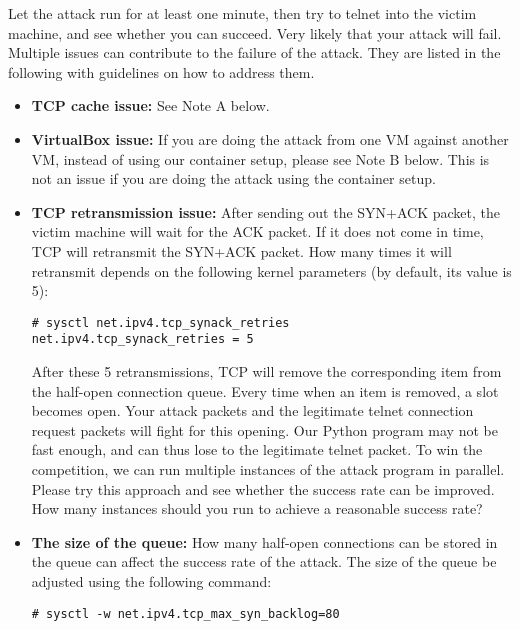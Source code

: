 Let the attack run for at least one minute, then try to telnet 
into the victim machine, and see whether you can succeed. Very likely that
your attack will fail. Multiple issues can contribute to the failure 
of the attack. They are listed in the following with guidelines 
on how to address them. 

\begin{itemize}
  \item \textbf{TCP cache issue:} See Note A below.

  \item \textbf{VirtualBox issue:} If you are doing the attack from one VM against another VM, 
    instead of using our container setup, please see Note B below. This is not an issue
    if you are doing the attack using the container setup.

  \item \textbf{TCP retransmission issue:} 
    After sending out the SYN+ACK packet, the victim machine will wait for 
    the ACK packet. If it does not come in time, TCP will retransmit the SYN+ACK packet. 
    How many times it will retransmit depends on the following kernel parameters (by default,
    its value is 5):
    
\begin{lstlisting}
# sysctl net.ipv4.tcp_synack_retries
net.ipv4.tcp_synack_retries = 5
\end{lstlisting}

    After these 5 retransmissions, TCP will remove the corresponding item
    from the half-open connection queue. Every time when an item is removed,
    a slot becomes open. Your attack packets and the legitimate 
    telnet connection request packets will fight for this opening.
    Our Python program may not be fast enough, and can thus lose to 
    the legitimate telnet packet. To win the competition, we can run multiple instances
    of the attack program in parallel. Please try this approach and 
    see whether the success rate can be improved. How many instances 
    should you run to achieve a reasonable success rate? 

  \item \textbf{The size of the queue:}  
    How many half-open connections can be stored in the queue
    can affect the success rate of the attack. 
    The size of the queue be adjusted using the following command:

\begin{lstlisting}
# sysctl -w net.ipv4.tcp_max_syn_backlog=80
\end{lstlisting}
     

\end{itemize}
